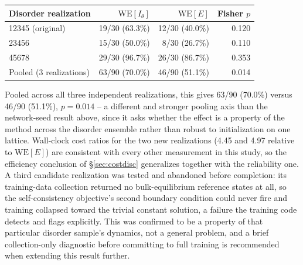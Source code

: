 \documentclass[a4paper,fleqn]{cas-sc}
\newcommand{\WE}{\mathrm{WE}}
\begin{document}
\begin{center}
\begin{minipage}{0.80\linewidth}
\centering
{}
\label{tab:disorder}
\begin{tabular}{lrrr}
\toprule
Disorder realization & $\WE[I_\theta]$ & $\WE[E]$ & Fisher $p$ \\
\midrule
12345 (original) & 19/30 (63.3\%) & 12/30 (40.0\%) & 0.120 \\
23456 & 15/30 (50.0\%) & 8/30 (26.7\%) & 0.110 \\
45678 & 29/30 (96.7\%) & 26/30 (86.7\%) & 0.353 \\
\midrule
Pooled (3 realizations) & 63/90 (70.0\%) & 46/90 (51.1\%) & 0.014 \\
\bottomrule
\end{tabular}
\end{minipage}
\end{center}

Pooled across all three independent realizations, this gives 63/90 (70.0\%) versus 46/90 (51.1\%), $p=0.014$ -- a different and stronger pooling axis than the network-seed result above, since it asks whether the effect is a property of the method across the disorder ensemble rather than robust to initialization on one lattice. Wall-clock cost ratios for the two new realizations (4.45 and 4.97 relative to $\WE[E]$) are consistent with every other measurement in this study, so the efficiency conclusion of \S\ref{sec:costdisc} generalizes together with the reliability one. A third candidate realization was tested and abandoned before completion: its training-data collection returned no bulk-equilibrium reference states at all, so the self-consistency objective's second boundary condition could never fire and training collapsed toward the trivial constant solution, a failure the training code detects and flags explicitly. This was confirmed to be a property of that particular disorder sample's dynamics, not a general problem, and a brief collection-only diagnostic before committing to full training is recommended when extending this result further.
\end{document}
